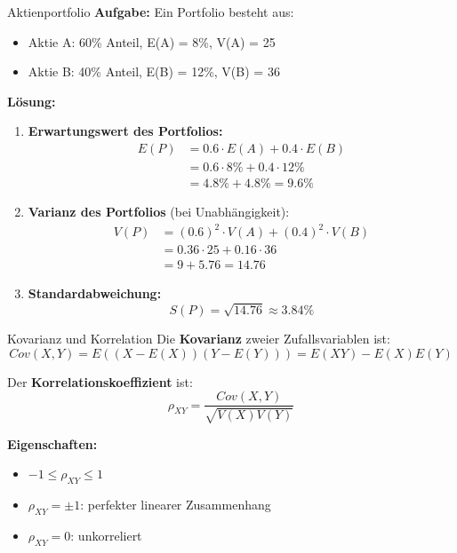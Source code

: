 \begin{example}{Aktienportfolio}
\textbf{Aufgabe:} Ein Portfolio besteht aus:
\begin{itemize}
\item Aktie A: 60\% Anteil, E(A) = 8\%, V(A) = 25
\item Aktie B: 40\% Anteil, E(B) = 12\%, V(B) = 36
\end{itemize}

\textbf{Lösung:}
\begin{enumerate}
\item \textbf{Erwartungswert des Portfolios:}
   \begin{align*}
   E(P) &= 0.6 \cdot E(A) + 0.4 \cdot E(B) \\
   &= 0.6 \cdot 8\% + 0.4 \cdot 12\% \\
   &= 4.8\% + 4.8\% = 9.6\%
   \end{align*}

\item \textbf{Varianz des Portfolios} (bei Unabhängigkeit):
   \begin{align*}
   V(P) &= (0.6)^2 \cdot V(A) + (0.4)^2 \cdot V(B) \\
   &= 0.36 \cdot 25 + 0.16 \cdot 36 \\
   &= 9 + 5.76 = 14.76
   \end{align*}

\item \textbf{Standardabweichung:}
   $$S(P) = \sqrt{14.76} \approx 3.84\%$$
\end{enumerate}
\end{example}

\begin{definition}{Kovarianz und Korrelation}
Die \textbf{Kovarianz} zweier Zufallsvariablen ist:
$$Cov(X,Y) = E((X-E(X))(Y-E(Y))) = E(XY) - E(X)E(Y)$$

Der \textbf{Korrelationskoeffizient} ist:
$$\rho_{XY} = \frac{Cov(X,Y)}{\sqrt{V(X)V(Y)}}$$

\textbf{Eigenschaften:}
\begin{itemize}
    \item $-1 \leq \rho_{XY} \leq 1$
    \item $\rho_{XY} = \pm 1$: perfekter linearer Zusammenhang
    \item $\rho_{XY} = 0$: unkorreliert
\end{itemize}
\end{definition}

